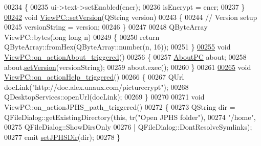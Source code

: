 \begin{DoxyCode}
00234 \{
00235     ui->text->setEnabled(encr);
00236     isEncrypt = encr;
00237 \}
\mbox{\hyperlink{class_view_p_c_ac05220df875b7c4f24405a5742476ebf}{00242}} \textcolor{keywordtype}{void} \mbox{\hyperlink{class_view_p_c_ac05220df875b7c4f24405a5742476ebf}{ViewPC::setVersion}}(QString version)
00243 \{
00244     \textcolor{comment}{// Version setup}
00245     versionString = version;
00246 \}
00247 
00248 QByteArray ViewPC::bytes(\textcolor{keywordtype}{long} \textcolor{keywordtype}{long} n)
00249 \{
00250     \textcolor{keywordflow}{return} QByteArray::fromHex(QByteArray::number(n, 16));
00251 \}
\mbox{\hyperlink{class_view_p_c_a09a46da4d492eb3dde88f35dc58c997b}{00255}} \textcolor{keywordtype}{void} \mbox{\hyperlink{class_view_p_c_a09a46da4d492eb3dde88f35dc58c997b}{ViewPC::on\_actionAbout\_triggered}}()
00256 \{
00257     \mbox{\hyperlink{class_about_p_c}{AboutPC}} about;
00258     about.\mbox{\hyperlink{class_about_p_c_aa3815d4826d0c8d87122449537a0a4d5}{setVersion}}(versionString);
00259     about.exec();
00260 \}
00261 
\mbox{\hyperlink{class_view_p_c_a0d252ff4829260c6c76769fbd24b7cd7}{00265}} \textcolor{keywordtype}{void} \mbox{\hyperlink{class_view_p_c_a0d252ff4829260c6c76769fbd24b7cd7}{ViewPC::on\_actionHelp\_triggered}}()
00266 \{
00267     QUrl docLink(\textcolor{stringliteral}{"http://doc.alex.unaux.com/picturecrypt"});
00268     QDesktopServices::openUrl(docLink);
00269 \}
00270 
00271 \textcolor{keywordtype}{void} ViewPC::on\_actionJPHS\_path\_triggered()
00272 \{
00273     QString dir = QFileDialog::getExistingDirectory(\textcolor{keyword}{this}, tr(\textcolor{stringliteral}{"Open JPHS folder"}),
00274                                                     \textcolor{stringliteral}{"/home"},
00275                                                     QFileDialog::ShowDirsOnly
00276                                                     | QFileDialog::DontResolveSymlinks);
00277     emit \mbox{\hyperlink{class_view_p_c_ababceedc355ecc1217a4c708e19e5e6b}{setJPHSDir}}(dir);
00278 \}
\end{DoxyCode}
